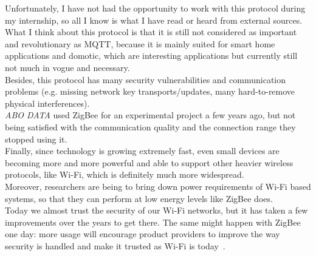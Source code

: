 \documentclass[12pt]{report}
\begin{document}
Unfortunately, I have not had the opportunity to work with this protocol during my internship, so all I know is what I have read or heard from external sources.\\

What I think about this protocol is that it is still not considered as important and revolutionary as MQTT, because it is mainly suited for smart home applications and domotic, which are interesting applications but currently still not much in vogue and necessary.\\ Besides, this protocol has many security vulnerabilities and communication problems (e.g. missing network key transports/updates, many hard-to-remove physical interferences).\\
\emph{ABO DATA} used ZigBee for an experimental project a few years ago, but not being satisfied with the communication quality and the connection range they stopped using it.\\

Finally, since technology is growing extremely fast, even small devices are becoming more and more powerful and able to support other heavier wireless protocols, like Wi-Fi, which is definitely much more widespread.\\
Moreover, researchers are being to bring down power requirements of Wi-Fi based systems, so that they can perform at low energy levels like ZigBee does.\\

Today we almost trust the security of our Wi-Fi networks, but it has taken a few improvements over the years to get there. The same might happen with ZigBee one day: more usage will encourage product providers to improve the way security is handled and make it trusted as Wi-Fi is today~\cite{zigbeesmarthomeissues}.\\



 

\end{document}
